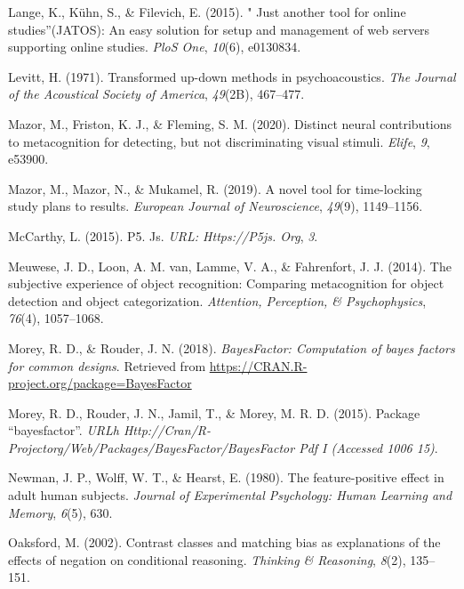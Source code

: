 \documentclass[
  english,
  man,floatsintext]{apa6}
\begin{document}
\leavevmode\hypertarget{ref-lange2015just}{}%
Lange, K., Kühn, S., \& Filevich, E. (2015). " Just another tool for online studies''(JATOS): An easy solution for setup and management of web servers supporting online studies. \emph{PloS One}, \emph{10}(6), e0130834.

\leavevmode\hypertarget{ref-levitt1971transformed}{}%
Levitt, H. (1971). Transformed up-down methods in psychoacoustics. \emph{The Journal of the Acoustical Society of America}, \emph{49}(2B), 467--477.

\leavevmode\hypertarget{ref-mazor2020distinct}{}%
Mazor, M., Friston, K. J., \& Fleming, S. M. (2020). Distinct neural contributions to metacognition for detecting, but not discriminating visual stimuli. \emph{Elife}, \emph{9}, e53900.

\leavevmode\hypertarget{ref-mazor2019novel}{}%
Mazor, M., Mazor, N., \& Mukamel, R. (2019). A novel tool for time-locking study plans to results. \emph{European Journal of Neuroscience}, \emph{49}(9), 1149--1156.

\leavevmode\hypertarget{ref-mccarthy2015p5}{}%
McCarthy, L. (2015). P5. Js. \emph{URL: Https://P5js. Org}, \emph{3}.

\leavevmode\hypertarget{ref-meuwese2014subjective}{}%
Meuwese, J. D., Loon, A. M. van, Lamme, V. A., \& Fahrenfort, J. J. (2014). The subjective experience of object recognition: Comparing metacognition for object detection and object categorization. \emph{Attention, Perception, \& Psychophysics}, \emph{76}(4), 1057--1068.

\leavevmode\hypertarget{ref-R-BayesFactor}{}%
Morey, R. D., \& Rouder, J. N. (2018). \emph{BayesFactor: Computation of bayes factors for common designs}. Retrieved from \url{https://CRAN.R-project.org/package=BayesFactor}

\leavevmode\hypertarget{ref-morey2015package}{}%
Morey, R. D., Rouder, J. N., Jamil, T., \& Morey, M. R. D. (2015). Package ``bayesfactor''. \emph{URLh Http://Cran/R-Projectorg/Web/Packages/BayesFactor/BayesFactor Pdf I (Accessed 1006 15)}.

\leavevmode\hypertarget{ref-newman1980feature}{}%
Newman, J. P., Wolff, W. T., \& Hearst, E. (1980). The feature-positive effect in adult human subjects. \emph{Journal of Experimental Psychology: Human Learning and Memory}, \emph{6}(5), 630.

\leavevmode\hypertarget{ref-oaksford2002contrast}{}%
Oaksford, M. (2002). Contrast classes and matching bias as explanations of the effects of negation on conditional reasoning. \emph{Thinking \& Reasoning}, \emph{8}(2), 135--151.
\end{document}
